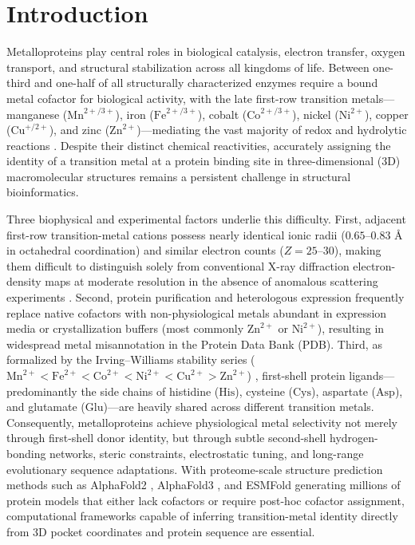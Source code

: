 \documentclass[10pt,a4paper,twocolumn]{article}
\begin{document}
\section{Introduction}

Metalloproteins play central roles in biological catalysis, electron transfer, oxygen transport, and structural stabilization across all kingdoms of life. Between one-third and one-half of all structurally characterized enzymes require a bound metal cofactor for biological activity, with the late first-row transition metals---manganese ($\text{Mn}^{2+/3+}$), iron ($\text{Fe}^{2+/3+}$), cobalt ($\text{Co}^{2+/3+}$), nickel ($\text{Ni}^{2+}$), copper ($\text{Cu}^{+/2+}$), and zinc ($\text{Zn}^{2+}$)---mediating the vast majority of redox and hydrolytic reactions \cite{irving1953stability,zheng2017checkmymetal}. Despite their distinct chemical reactivities, accurately assigning the identity of a transition metal at a protein binding site in three-dimensional (3D) macromolecular structures remains a persistent challenge in structural bioinformatics.

Three biophysical and experimental factors underlie this difficulty. First, adjacent first-row transition-metal cations possess nearly identical ionic radii ($0.65\text{--}0.83\text{ \AA}$ in octahedral coordination) and similar electron counts ($Z = 25\text{--}30$), making them difficult to distinguish solely from conventional X-ray diffraction electron-density maps at moderate resolution in the absence of anomalous scattering experiments \cite{zheng2017checkmymetal}. Second, protein purification and heterologous expression frequently replace native cofactors with non-physiological metals abundant in expression media or crystallization buffers (most commonly $\text{Zn}^{2+}$ or $\text{Ni}^{2+}$), resulting in widespread metal misannotation in the Protein Data Bank (PDB). Third, as formalized by the Irving--Williams stability series ($\text{Mn}^{2+} < \text{Fe}^{2+} < \text{Co}^{2+} < \text{Ni}^{2+} < \text{Cu}^{2+} > \text{Zn}^{2+}$) \cite{irving1953stability}, first-shell protein ligands---predominantly the side chains of histidine ($\text{His}$), cysteine ($\text{Cys}$), aspartate ($\text{Asp}$), and glutamate ($\text{Glu}$)---are heavily shared across different transition metals. Consequently, metalloproteins achieve physiological metal selectivity not merely through first-shell donor identity, but through subtle second-shell hydrogen-bonding networks, steric constraints, electrostatic tuning, and long-range evolutionary sequence adaptations. With proteome-scale structure prediction methods such as AlphaFold2 \cite{jumper2021alphafold}, AlphaFold3 \cite{abramson2024alphafold3}, and ESMFold \cite{lin2023esmfold} generating millions of protein models that either lack cofactors or require post-hoc cofactor assignment, computational frameworks capable of inferring transition-metal identity directly from 3D pocket coordinates and protein sequence are essential.
\end{document}

